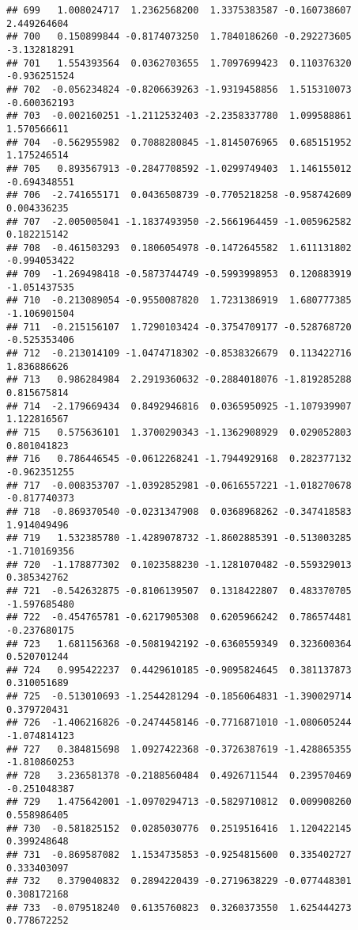 \documentclass[
]{article}
\begin{document}
\begin{verbatim}
## 699   1.008024717  1.2362568200  1.3375383587 -0.160738607  2.449264604
## 700   0.150899844 -0.8174073250  1.7840186260 -0.292273605 -3.132818291
## 701   1.554393564  0.0362703655  1.7097699423  0.110376320 -0.936251524
## 702  -0.056234824 -0.8206639263 -1.9319458856  1.515310073 -0.600362193
## 703  -0.002160251 -1.2112532403 -2.2358337780  1.099588861  1.570566611
## 704  -0.562955982  0.7088280845 -1.8145076965  0.685151952  1.175246514
## 705   0.893567913 -0.2847708592 -1.0299749403  1.146155012 -0.694348551
## 706  -2.741655171  0.0436508739 -0.7705218258 -0.958742609  0.004336235
## 707  -2.005005041 -1.1837493950 -2.5661964459 -1.005962582  0.182215142
## 708  -0.461503293  0.1806054978 -0.1472645582  1.611131802 -0.994053422
## 709  -1.269498418 -0.5873744749 -0.5993998953  0.120883919 -1.051437535
## 710  -0.213089054 -0.9550087820  1.7231386919  1.680777385 -1.106901504
## 711  -0.215156107  1.7290103424 -0.3754709177 -0.528768720 -0.525353406
## 712  -0.213014109 -1.0474718302 -0.8538326679  0.113422716  1.836886626
## 713   0.986284984  2.2919360632 -0.2884018076 -1.819285288  0.815675814
## 714  -2.179669434  0.8492946816  0.0365950925 -1.107939907  1.122816567
## 715   0.575636101  1.3700290343 -1.1362908929  0.029052803  0.801041823
## 716   0.786446545 -0.0612268241 -1.7944929168  0.282377132 -0.962351255
## 717  -0.008353707 -1.0392852981 -0.0616557221 -1.018270678 -0.817740373
## 718  -0.869370540 -0.0231347908  0.0368968262 -0.347418583  1.914049496
## 719   1.532385780 -1.4289078732 -1.8602885391 -0.513003285 -1.710169356
## 720  -1.178877302  0.1023588230 -1.1281070482 -0.559329013  0.385342762
## 721  -0.542632875 -0.8106139507  0.1318422807  0.483370705 -1.597685480
## 722  -0.454765781 -0.6217905308  0.6205966242  0.786574481 -0.237680175
## 723   1.681156368 -0.5081942192 -0.6360559349  0.323600364  0.520701244
## 724   0.995422237  0.4429610185 -0.9095824645  0.381137873  0.310051689
## 725  -0.513010693 -1.2544281294 -0.1856064831 -1.390029714  0.379720431
## 726  -1.406216826 -0.2474458146 -0.7716871010 -1.080605244 -1.074814123
## 727   0.384815698  1.0927422368 -0.3726387619 -1.428865355 -1.810860253
## 728   3.236581378 -0.2188560484  0.4926711544  0.239570469 -0.251048387
## 729   1.475642001 -1.0970294713 -0.5829710812  0.009908260  0.558986405
## 730  -0.581825152  0.0285030776  0.2519516416  1.120422145  0.399248648
## 731  -0.869587082  1.1534735853 -0.9254815600  0.335402727  0.333403097
## 732   0.379040832  0.2894220439 -0.2719638229 -0.077448301  0.308172168
## 733  -0.079518240  0.6135760823  0.3260373550  1.625444273  0.778672252

\end{verbatim}
\end{document}
